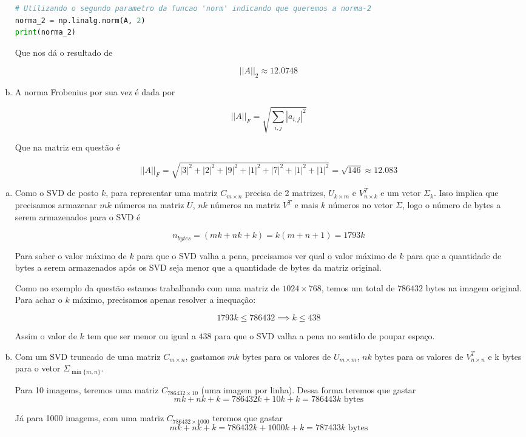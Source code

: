 \documentclass[11pt]{article}
\begin{document}
\begin{exerc}
\begin{enumerate}[a.]
\begin{lstlisting}[language=Python]
# Utilizando o segundo parametro da funcao 'norm' indicando que queremos a norma-2
norma_2 = np.linalg.norm(A, 2)
print(norma_2)
\end{lstlisting}

Que nos dá o resultado de

$$||A||_2 \approx 12.0748$$

\item
A norma Frobenius por sua vez é dada por

$$||A||_F = \sqrt{\sum_{i,j}|a_{i,j}|^2}$$

Que na matriz em questão é

$$||A||_F = \sqrt{|3|^2 + |2|^2 + |9|^2 + |1|^2 + |7|^2 + |1|^2 + |1|^2} = \sqrt{146} \approx 12.083$$

\end{enumerate}
\end{exerc}

\begin{exerc}
\begin{enumerate}[a.]
.
\item
Como o SVD de posto $k$, para representar uma matriz $C_{m \times n}$ precisa de 2 matrizes, $U_{k \times m}$ e $V^T_{n \times k}$ e um vetor $\Sigma_{k}$. Isso implica que precisamos armazenar $mk$ números na matriz $U$, $nk$ números na matriz $V^T$ e mais $k$ números no vetor $\Sigma$, logo o número de bytes a serem armazenados para o SVD é

$$n_{bytes} = (mk + nk + k) = k(m + n + 1) = 1793k$$

Para saber o valor máximo de $k$ para que o SVD valha a pena, precisamos ver qual o valor máximo de $k$ para que a quantidade de bytes a serem armazenados após os SVD seja menor que a quantidade de bytes da matriz original.

Como no exemplo da questão estamos trabalhando com uma matriz de $1024 \times 768$, temos um total de $786432$ bytes na imagem original. Para achar o $k$ máximo, precisamos apenas resolver a inequação:

$$1793k \le 786432 \implies k \le 438$$

Assim o valor de $k$ tem que ser menor ou igual a $438$ para que o SVD valha a pena no sentido de poupar espaço.

\item



Com um SVD truncado de uma matriz $C_{m \times n}$, gastamos $mk$ bytes para os valores de $U_{m \times m}$, $nk$ bytes para os valores de $V^T_{n \times n}$ e k bytes para o vetor $\Sigma_{\min\{m, n\}}$.

Para 10 imagems, teremos uma matriz $C_{786432 \times 10}$ (uma imagem por linha). Dessa forma teremos que gastar
$$mk + nk + k = 786432k + 10k + k = 786443k \text{ bytes}$$

Já para 1000 imagems, com uma matriz $C_{786432 \times 1000}$ teremos que gastar
$$mk + nk + k = 786432k + 1000k + k = 787433k \text{ bytes}$$

\end{enumerate}
\end{exerc}
\end{document}
